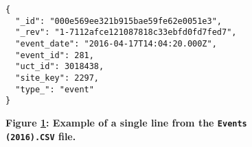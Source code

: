 \begin{figure}[H]
  \centering
  \begin{mdframed}
    \centering
    \begin{verbatim}
{
  "_id": "000e569ee321b915bae59fe62e0051e3",
  "_rev": "1-7112afce121087818c33ebfd0fd7fed7",
  "event_date": "2016-04-17T14:04:20.000Z",
  "event_id": 281,
  "uct_id": 3018438,
  "site_key": 2297,
  "type_": "event"
}           
        \end{verbatim}
  \end{mdframed}
  \caption[Event Document JSON Sample]{\textbf{Figure \ref{fig-events-json-sample}: Example of a single line from the \texttt{Events (2016).CSV} file.}}
  \label{fig-events-json-sample}
\end{figure}